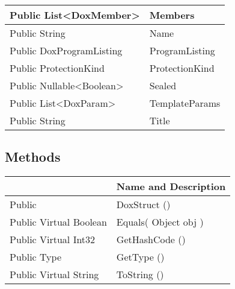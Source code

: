 \documentclass[11pt, oneside, a4paper]{book}
\begin{document}
\begin{center}
\begin{tabular}{| p{3cm} | p{12cm} | }
\hline
 Public  List<DoxMember> &  Members\hypertarget{SoftwareEngineeringTools.{}Documentation.{}DoxStruct.{}Members}{}\\
\hline
 Public  String &  Name\hypertarget{SoftwareEngineeringTools.{}Documentation.{}DoxStruct.{}Name}{}\\
\hline
 Public  DoxProgramListing &  ProgramListing\hypertarget{SoftwareEngineeringTools.{}Documentation.{}DoxStruct.{}ProgramListing}{}\\
\hline
 Public  ProtectionKind &  ProtectionKind\hypertarget{SoftwareEngineeringTools.{}Documentation.{}DoxStruct.{}ProtectionKind}{}\\
\hline
 Public  Nullable<Boolean> &  Sealed\hypertarget{SoftwareEngineeringTools.{}Documentation.{}DoxStruct.{}Sealed}{}\\
\hline
 Public  List<DoxParam> &  TemplateParams\hypertarget{SoftwareEngineeringTools.{}Documentation.{}DoxStruct.{}TemplateParams}{}\\
\hline
 Public  String &  Title\hypertarget{SoftwareEngineeringTools.{}Documentation.{}DoxStruct.{}Title}{}\\
\hline
\end{tabular}
\end{center}

\subsection{Methods}
\begin{center}
\begin{tabular}{| p{3cm} | p{12cm} | }
\hline
\textbf{ } & \textbf{ Name and Description}\\
\hline
 Public  &  DoxStruct ()\hypertarget{SoftwareEngineeringTools.{}Documentation.{}DoxStruct.{}DoxStruct}{}\\
\hline
 Public  Virtual  Boolean &  Equals(\hypertarget{SoftwareEngineeringTools.{}Documentation.{}DoxStruct.{}Equals\_Object}{} Object  obj  )\\
\hline
 Public  Virtual  Int32 &  GetHashCode ()\hypertarget{SoftwareEngineeringTools.{}Documentation.{}DoxStruct.{}GetHashCode}{}\\
\hline
 Public  Type &  GetType ()\hypertarget{SoftwareEngineeringTools.{}Documentation.{}DoxStruct.{}GetType}{}\\
\hline
 Public  Virtual  String &  ToString ()\hypertarget{SoftwareEngineeringTools.{}Documentation.{}DoxStruct.{}ToString}{}\\
\hline
\end{tabular}
\end{center}
 
\end{document}
